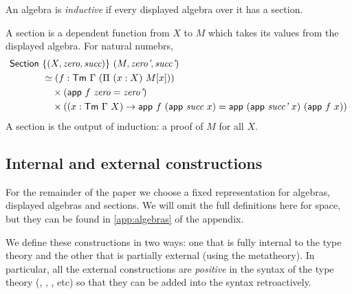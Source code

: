 \begin{definition}
An algebra is \emph{inductive} if every displayed algebra over it has a section.
\end{definition}
A section is a dependent function from $X$ to $M$ which takes its values from
the displayed algebra. For natural numebrs,
\begin{align*}
	\mta{Section}\  & \{(X, \textit{zero}, \textit{succ})\}\ (M, \textit{zero'}, \textit{succ'})                                                                                           \\
	                & \simeq (f : \Tm\ \Gamma\ (\Pi\ (x : X)\ M[x]))                                                                                   \\
	                & \quad \times (\mta{app}\ f\ \textit{zero} = \textit{zero'})                                                                                        \\
	                & \quad \times ((x : \Tm\ \Gamma\ X) \to \mta{app}\ f\ (\mta{app}\ \textit{succ}\ x) = \mta{app}\ (\mta{app}\ \textit{succ'}\ x)\ (\mta{app}\ f\ x))
\end{align*}
A section is the output of induction: a proof of $M$ for all $X$.

\subsection{Internal and external constructions}

For the remainder of the paper we choose a fixed representation for algebras,
displayed algebras and sections. We will omit the full definitions here for
space, but they can be found in \cref{app:algebras} of the appendix.

We define these constructions in two ways: one that is fully internal to the
type theory and the other that is partially external (using the metatheory).
In particular, all the external constructions are \emph{positive} in the
syntax of the type theory (, , , etc) so that
they can be added into the syntax retroactively.

